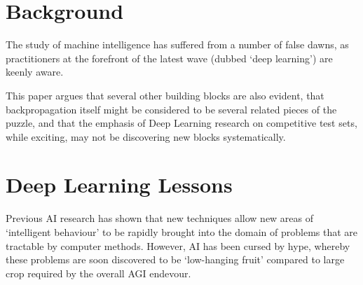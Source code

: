 \documentclass[citeauthoryear]{llncs}
\begin{document}
\section{Background}
The study of machine intelligence has suffered from a number of false dawns, 
as practitioners at the forefront of the latest wave (dubbed `deep learning') 
are keenly aware.  

This paper argues that several other building blocks are also evident, 
that backpropagation itself might be considered to be several related pieces of the puzzle,
and that the emphasis of Deep Learning research on competitive test sets, 
while exciting, may not be discovering new blocks systematically.

  


%
%
%

\section{Deep Learning Lessons}
Previous AI research has shown that new techniques allow new areas 
of `intelligent behaviour' to be rapidly brought into the domain of 
problems that are tractable by computer methods.  However, AI has been 
cursed by hype, whereby these problems are soon discovered to 
be `low-hanging fruit' compared to large crop required by the 
overall AGI endevour.
\end{document}
